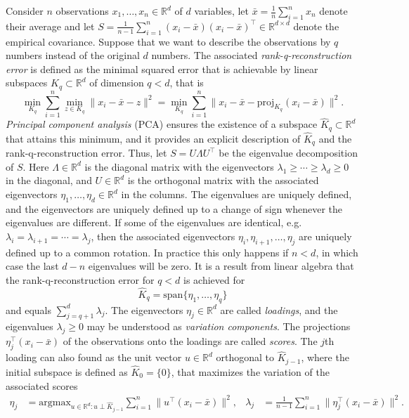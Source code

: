 \documentclass[titlepage,11pt,twoside]{article}
\newcommand{\RR}{\mathbb{R}}
\newcommand{\argmax}{\text{argmax}}
\begin{document}
Consider $n$ observations $x_1,\dotsc,x_n \in \RR^d$ of $d$ variables, let $\bar{x} = \frac{1}{n} \sum_{i=1}^n x_n$ denote their average and let $S = \frac{1}{n-1} \sum_{i=1}^n (x_i-\bar{x}) (x_i-\bar{x})^\top \in \RR^{d \times d}$ denote the empirical covariance. Suppose that we want to describe the observations by $q$ numbers instead of the original $d$ numbers. The associated \emph{rank-q-reconstruction error} is defined as the minimal squared error that is achievable by linear subspaces $K_q \subset \RR^d$ of dimension $q < d$, that is
\begin{equation*}
\min_{K_q} \sum_{i=1}^n \min_{z \in K_q} \lVert x_i - \bar{x} - z \rVert^2 =
\min_{K_q} \sum_{i=1}^n \lVert x_i - \bar{x} - \text{proj}_{K_q}(x_i - \bar{x}) \rVert^2.
\end{equation*}
\emph{Principal component analysis} (PCA) ensures the existence of a subspace $\hat{K}_q \subset \RR^d$ that attains this minimum, and it provides an explicit description of $\hat{K}_q$ and the rank-q-reconstruction error. Thus, let $S = U \Lambda U^\top$ be the eigenvalue decomposition of $S$. Here $\Lambda \in \RR^d$ is the diagonal matrix with the eigenvectors $\lambda_1 \ge \dotsm \ge \lambda_d \ge 0$ in the diagonal, and $U \in \RR^d$ is the orthogonal matrix with the associated eigenvectors $\eta_1,\dotsc,\eta_d \in \RR^d$ in the columns. The eigenvalues are uniquely defined, and the eigenvectors are uniquely defined up to a change of sign whenever the eigenvalues are different. If some of the eigenvalues are identical, e.g.\ $\lambda_i=\lambda_{i+1}=\dotsm=\lambda_j$, then the associated eigenvectors $\eta_i,\eta_{i+1},\dotsc,\eta_j$ are uniquely defined up to a common rotation. In practice this only happens if $n < d$, in which case the last $d-n$ eigenvalues will be zero. It is a result from linear algebra that the rank-q-reconstruction error for $q < d$ is achieved for
\begin{equation*}
\hat{K}_q = \text{span}\{\eta_1,\dotsc,\eta_q\}
\end{equation*}
and equals $\sum_{j=q+1}^d \lambda_j$. The eigenvectors $\eta_j \in \RR^d$ are called \emph{loadings}, and the eigenvalues $\lambda_j \ge 0$ may be understood as \emph{variation components}. The projections $\eta_j^\top (x_i - \bar{x})$ of the observations onto the loadings are called \emph{scores}. The $j$th loading can also found as the unit vector $u \in \RR^d$ orthogonal to $\hat{K}_{j-1}$, where the initial subspace is defined as $\hat{K}_0 = \{0\}$, that maximizes the variation of the associated scores
\begin{align*}
\eta_j &= \argmax_{u \in \RR^d\colon u \perp \hat{K}_{j-1}} \sum_{i=1}^n \lVert u^\top (x_i - \bar{x}) \rVert^2, &
\lambda_j &= \frac{1}{n-1} \sum_{i=1}^n \lVert \eta_j^\top (x_i - \bar{x}) \rVert^2.
\end{align*}
\end{document}
